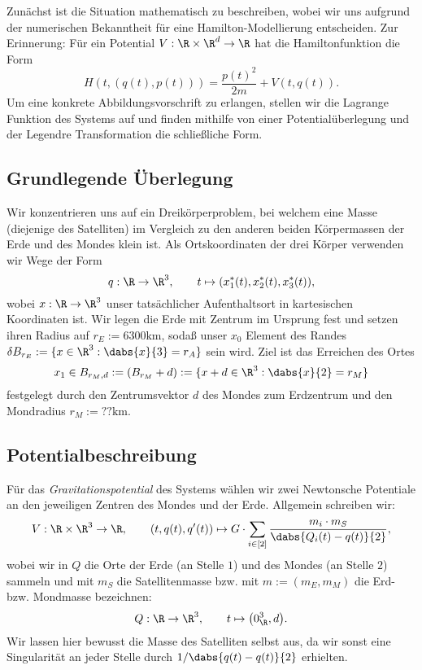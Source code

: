 \documentclass{subfiles}
\begin{document}
    

    Zunächst ist die Situation mathematisch zu beschreiben, wobei wir uns aufgrund der numerischen Bekanntheit für eine Hamilton-Modellierung entscheiden. Zur Erinnerung: Für ein Potential $V:\R\times\R^d\to\R$ hat die Hamiltonfunktion die Form 
    \[
        H(t,(q(t),p(t))) = \frac{p(t)^2}{2m} + V(t,q(t)).
    \]
    Um eine konkrete Abbildungsvorschrift zu erlangen, stellen wir die Lagrange Funktion des Systems auf und finden mithilfe von einer Potentialüberlegung und der Legendre Transformation die schließliche Form. 

    \subsection*{Grundlegende Überlegung}
        Wir konzentrieren uns auf ein Dreikörperproblem, bei welchem eine Masse (diejenige des Satelliten) im Vergleich zu den anderen beiden Körpermassen der Erde und des Mondes klein ist. Als Ortskoordinaten der drei Körper verwenden wir Wege der Form 
        \[
            q:\R\to\R^3,\qquad t\mapsto (x_1^*(t),x_2^*(t),x_3^*(t)),
        \]
        wobei $x:\R\to\R^3$ unser tatsächlicher Aufenthaltsort in kartesischen Koordinaten ist. Wir legen die Erde mit Zentrum im Ursprung fest und setzen ihren Radius auf $r_E:=6300\si{\kilo\metre}$, sodaß unser $x_0$ Element des Randes $\delta B_{r_E}:=\{x\in\R^3:\dabs{x}{3} = r_A\}$ sein wird. Ziel ist das Erreichen des Ortes
        \[
            x_1\in B_{r_M,d}:=(B_{r_M}+d):=\{x + d\in\R^3:\dabs{x}{2} = r_M\}
        \]
        festgelegt durch den Zentrumsvektor $d$ des Mondes zum Erdzentrum und den Mondradius $r_M:=??\si{\kilo\metre}$.

    \subsection*{Potentialbeschreibung}
        Für das \emph{Gravitationspotential} des Systems wählen wir zwei Newtonsche Potentiale an den jeweiligen Zentren des Mondes und der Erde. Allgemein schreiben wir:
        \[
            V:\R\times\R^3\to \R,\qquad (t,q(t),q'(t))\mapsto G\cdot\sum_{i\in[2]}\frac{m_i\cdot m_S}{\dabs{Q_i(t) - q(t)}{2}},
        \]
        wobei wir in $Q$ die Orte der Erde (an Stelle $1$) und des Mondes (an Stelle $2$) sammeln und mit $m_S$ die Satellitenmasse bzw. mit $m:=(m_E,m_M)$ die Erd- bzw. Mondmasse bezeichnen:
        \[
            Q:\R\to\R^3,\qquad t\mapsto \bigl(0_\R^3,d\bigr).
        \]
        Wir lassen hier bewusst die Masse des Satelliten selbst aus, da wir sonst eine Singularität an jeder Stelle durch $1/\dabs{q(t)-q(t)}{2}$ erhielten. 
\end{document}
